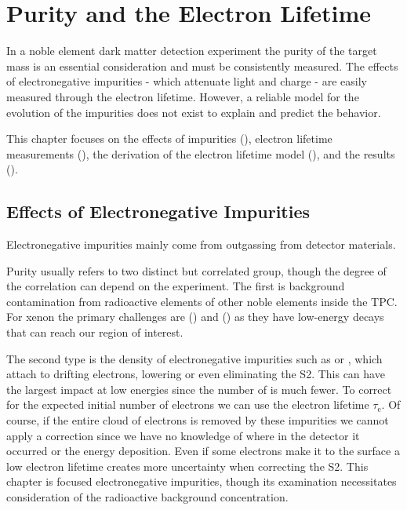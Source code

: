 

\pagestyle{cu}
\graphicspath{{./Chapter5/Figures/}}
\chapter[Purity and the Electron Lifetime][Purity and the Electron Lifetime]{Purity and the Electron Lifetime}
\label{chap:purification}

In a noble element dark matter detection experiment the purity of the target mass is an essential consideration and must be consistently
measured.  The effects of electronegative impurities - which attenuate light and charge - are easily measured through the electron
lifetime.  However, a reliable model for the evolution of the impurities does not exist to explain and predict the behavior.

This chapter focuses on the effects of impurities (), electron lifetime measurements
(), the derivation of the electron lifetime model (), and
the results (\secref{}).



\section{Effects of Electronegative Impurities}
\label{sec:importance_procedure_effects}
Electronegative impurities mainly come from outgassing from detector materials.

Purity usually refers to two distinct but correlated group, though the degree of the correlation can depend on the
experiment.  The first is background contamination from radioactive elements of other noble elements inside the TPC.  For xenon
the primary challenges are  () and 
() as they have low-energy decays that can reach our region of interest.

The second type is the density of electronegative impurities such as  or
, which attach to drifting electrons, lowering or even eliminating the S2.  This can have the largest impact at low energies
since the number of \electron is much fewer.  To correct for the expected initial number of electrons we can use the electron lifetime
$\tau_{\mathrm{e}}$.  Of course, if the entire cloud of electrons is
removed by these impurities we cannot apply a correction since we have no knowledge of where in the detector it occurred or the energy
deposition.  Even if some electrons make it to the surface a low electron lifetime creates more uncertainty when correcting the S2.  This
chapter is focused electronegative impurities, though its examination necessitates consideration of the radioactive background
concentration.

